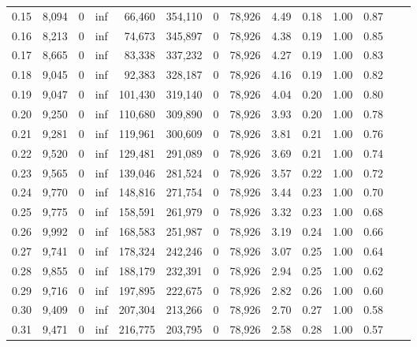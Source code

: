 \begin{tabular}{rrrrrrrrrrrrrr}
0.15 &  8,094 &      0 &      inf &   66,460 &  354,110 &       0 &  78,926 &  4.49 &  0.18 &  1.00 &      0.87 \\
0.16 &  8,213 &      0 &      inf &   74,673 &  345,897 &       0 &  78,926 &  4.38 &  0.19 &  1.00 &      0.85 \\
0.17 &  8,665 &      0 &      inf &   83,338 &  337,232 &       0 &  78,926 &  4.27 &  0.19 &  1.00 &      0.83 \\
0.18 &  9,045 &      0 &      inf &   92,383 &  328,187 &       0 &  78,926 &  4.16 &  0.19 &  1.00 &      0.82 \\
0.19 &  9,047 &      0 &      inf &  101,430 &  319,140 &       0 &  78,926 &  4.04 &  0.20 &  1.00 &      0.80 \\
0.20 &  9,250 &      0 &      inf &  110,680 &  309,890 &       0 &  78,926 &  3.93 &  0.20 &  1.00 &      0.78 \\
0.21 &  9,281 &      0 &      inf &  119,961 &  300,609 &       0 &  78,926 &  3.81 &  0.21 &  1.00 &      0.76 \\
0.22 &  9,520 &      0 &      inf &  129,481 &  291,089 &       0 &  78,926 &  3.69 &  0.21 &  1.00 &      0.74 \\
0.23 &  9,565 &      0 &      inf &  139,046 &  281,524 &       0 &  78,926 &  3.57 &  0.22 &  1.00 &      0.72 \\
0.24 &  9,770 &      0 &      inf &  148,816 &  271,754 &       0 &  78,926 &  3.44 &  0.23 &  1.00 &      0.70 \\
0.25 &  9,775 &      0 &      inf &  158,591 &  261,979 &       0 &  78,926 &  3.32 &  0.23 &  1.00 &      0.68 \\
0.26 &  9,992 &      0 &      inf &  168,583 &  251,987 &       0 &  78,926 &  3.19 &  0.24 &  1.00 &      0.66 \\
0.27 &  9,741 &      0 &      inf &  178,324 &  242,246 &       0 &  78,926 &  3.07 &  0.25 &  1.00 &      0.64 \\
0.28 &  9,855 &      0 &      inf &  188,179 &  232,391 &       0 &  78,926 &  2.94 &  0.25 &  1.00 &      0.62 \\
0.29 &  9,716 &      0 &      inf &  197,895 &  222,675 &       0 &  78,926 &  2.82 &  0.26 &  1.00 &      0.60 \\
0.30 &  9,409 &      0 &      inf &  207,304 &  213,266 &       0 &  78,926 &  2.70 &  0.27 &  1.00 &      0.58 \\
0.31 &  9,471 &      0 &      inf &  216,775 &  203,795 &       0 &  78,926 &  2.58 &  0.28 &  1.00 &      0.57 \\

\end{tabular}
